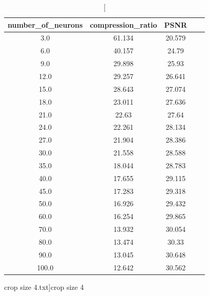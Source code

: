 \documentclass[../IDP_Task5_Karwowski_Kowalewski.tex]{subfiles}
\begin{document}
{{        \begin{table}[!htbp]
            \centering
            \begin{tabular}{|c|c|c|c|c|}
                \hline
                number\_of\_neurons & compression\_ratio & PSNR \\ \hline
                3.0 & 61.134 & 20.579 \\ \hline
                6.0 & 40.157 & 24.79 \\ \hline
                9.0 & 29.898 & 25.93 \\ \hline
                12.0 & 29.257 & 26.641 \\ \hline
                15.0 & 28.643 & 27.074 \\ \hline
                18.0 & 23.011 & 27.636 \\ \hline
                21.0 & 22.63 & 27.64 \\ \hline
                24.0 & 22.261 & 28.134 \\ \hline
                27.0 & 21.904 & 28.386 \\ \hline
                30.0 & 21.558 & 28.588 \\ \hline
                35.0 & 18.044 & 28.783 \\ \hline
                40.0 & 17.655 & 29.115 \\ \hline
                45.0 & 17.283 & 29.318 \\ \hline
                50.0 & 16.926 & 29.432 \\ \hline
                60.0 & 16.254 & 29.865 \\ \hline
                70.0 & 13.932 & 30.054 \\ \hline
                80.0 & 13.474 & 30.33 \\ \hline
                90.0 & 13.045 & 30.648 \\ \hline
                100.0 & 12.642 & 30.562 \\ \hline
            \end{tabular}
            \caption
            [crop size 4.txt]{crop size 4}
            \label{crop_size_4.txt}
        \end{table}

}}
\end{document}
